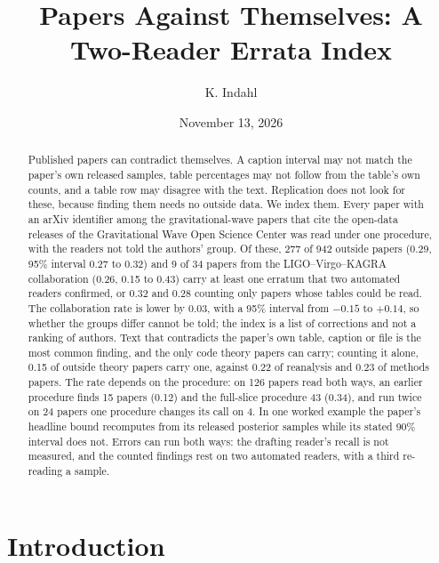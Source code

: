 \documentclass[reprint,amsmath,amssymb,aps,superscriptaddress,nofootinbib]{revtex4-2}
\begin{document}
\title{Papers Against Themselves: A Two-Reader Errata Index}

\author{K. Indahl}

\date{November 13, 2026}

\begin{abstract}
Published papers can contradict themselves. A caption interval may not match the paper's own released samples, table percentages may not follow from the table's own counts, and a table row may disagree with the text. Replication does not look for these, because finding them needs no outside data. We index them. Every paper with an arXiv identifier among the gravitational-wave papers that cite the open-data releases of the Gravitational Wave Open Science Center was read under one procedure, with the readers not told the authors' group. Of these, 277 of 942 outside papers (0.29, 95\% interval 0.27 to 0.32) and 9 of 34 papers from the LIGO--Virgo--KAGRA collaboration (0.26, 0.15 to 0.43) carry at least one erratum that two automated readers confirmed, or 0.32 and 0.28 counting only papers whose tables could be read. The collaboration rate is lower by 0.03, with a 95\% interval from $-0.15$ to $+0.14$, so whether the groups differ cannot be told; the index is a list of corrections and not a ranking of authors. Text that contradicts the paper's own table, caption or file is the most common finding, and the only code theory papers can carry; counting it alone, 0.15 of outside theory papers carry one, against 0.22 of reanalysis and 0.23 of methods papers. The rate depends on the procedure: on 126 papers read both ways, an earlier procedure finds 15 papers (0.12) and the full-slice procedure 43 (0.34), and run twice on 24 papers one procedure changes its call on 4. In one worked example the paper's headline bound recomputes from its released posterior samples while its stated 90\% interval does not. Errors can run both ways: the drafting reader's recall is not measured, and the counted findings rest on two automated readers, with a third re-reading a sample.
\end{abstract}

\maketitle

\section{Introduction}
\end{document}
